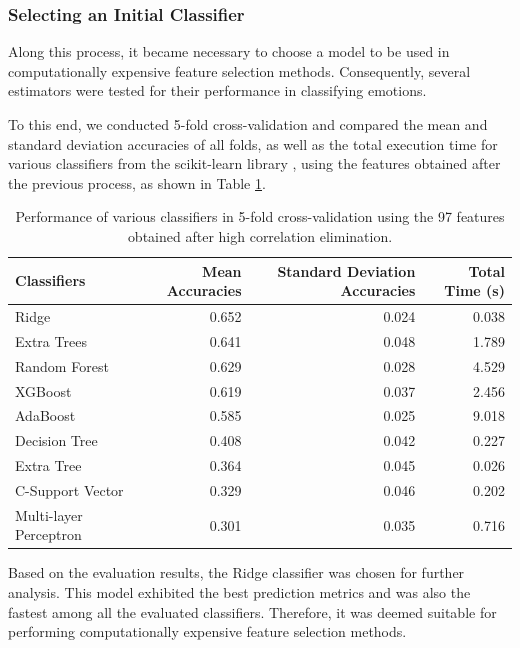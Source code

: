 \subsubsection{Selecting an Initial Classifier}

Along this process, it became necessary to choose a model to be used in computationally expensive feature selection methods. Consequently, several estimators were tested for their performance in classifying emotions.

To this end, we conducted 5-fold cross-validation and compared the mean and standard deviation accuracies of all folds, as well as the total execution time for various classifiers from the scikit-learn library \cite{pedregosa2011scikit}, using the features obtained after the previous process, as shown in Table \ref{tab:modelsPerformance}.

\begin{table}[H]
	\caption{Performance of various classifiers in 5-fold cross-validation using the 97 features obtained after high correlation elimination.}
	\centering
	\label{tab:modelsPerformance}
	\begin{tabular}{lrrr}
		\toprule
		Classifiers &   Mean Accuracies &   Standard Deviation Accuracies & Total Time (s)\\
		\midrule
		Ridge   &        0.652 &      0.024 & 0.038 \\
		Extra Trees   &        0.641 &      0.048 & 1.789 \\
		Random Forest &        0.629 &      0.028 & 4.529 \\
		XGBoost     &        0.619 &      0.037 & 2.456 \\
		AdaBoost   &        0.585 &      0.025 & 9.018 \\
		Decision Tree &        0.408 &      0.042 & 0.227 \\
		Extra Tree  &        0.364 &      0.045 & 0.026 \\
		C-Support Vector  &        0.329 &      0.046 & 0.202 \\
		Multi-layer Perceptron    &        0.301 &      0.035 & 0.716 \\
		\bottomrule
	\end{tabular}
\end{table}

Based on the evaluation results, the Ridge classifier was chosen for further analysis. This model exhibited the best prediction metrics and was also the fastest among all the evaluated classifiers. Therefore, it was deemed suitable for performing computationally expensive feature selection methods.


